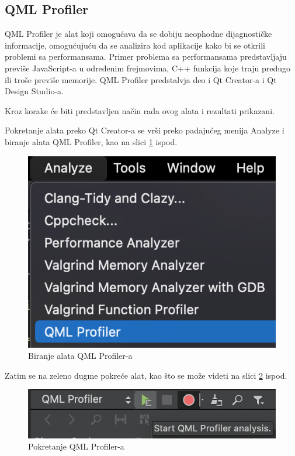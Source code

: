 \documentclass[a4paper]{article}
\begin{document}
\newpage
\subsection{QML Profiler}
QML Profiler je alat koji omogućava da se dobiju neophodne dijagnostičke informacije, omogućujuću da se analizira kod aplikacije kako bi se otkrili problemi sa performansama. Primer problema sa performansama predstavljaju previše JavaScript-a u određenim frejmovima, C++ funkcija koje traju predugo ili troše previše memorije.
QML Profiler predstalvja deo i Qt Creator-a i Qt Design Studio-a.

Kroz korake će biti predstavljen način rada ovog alata i rezultati prikazani.

Pokretanje alata preko Qt Creator-a se vrši preko padajućeg menija Analyze i biranje alata QML Profiler, kao na slici \ref{fig: qml-00} ispod.

\begin{figure}[h!]
\begin{center}
\includegraphics[scale=0.45]{qml-prof-00.png}
\end{center}
\caption{Biranje alata QML Profiler-a}
\label{fig: qml-00}
\end{figure}


Zatim se na zeleno dugme pokreće alat, kao što se može videti na slici \ref{fig: qml-01} ispod.

\begin{figure}[h!]
\begin{center}
\includegraphics[scale=0.45]{qml-prof-01.png}
\end{center}
\caption{Pokretanje QML Profiler-a}
\label{fig: qml-01}
\end{figure}
\end{document}
